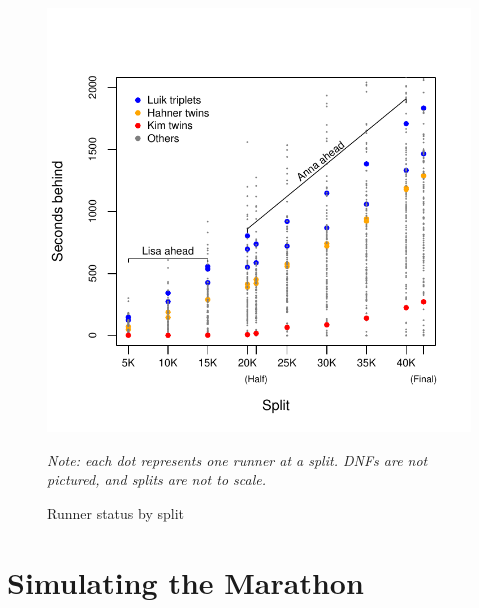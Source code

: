 \documentclass[12pt,titlepage]{article}
\begin{document}
\begin{figure}[!ht]
  \centering
  \caption{Runner status by split}
  \label{fig:secondsbehind}
  \includegraphics[scale = 1]{seconds-behind.pdf}
  \begin{flushleft}
    \emph{Note: each dot represents one runner at a split.  DNFs are
      not pictured, and splits are not to scale.}
  \end{flushleft}
\end{figure}


\section*{Simulating the Marathon}

\end{document}
